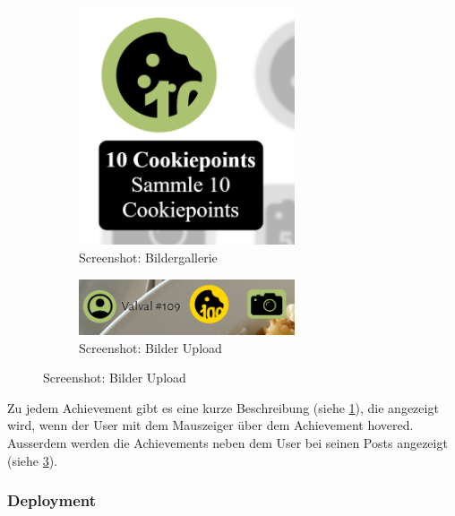 \begin{figure}[htp]
    \begin{subfigure}[b]{0.5\textwidth}
        \centering
        \includegraphics[width=0.7\textwidth]{images/Resultat-Beschreibung.png}
        \caption{Screenshot: Bildergallerie}
        \label{fig:r-Achievement-beschreibung}
    \end{subfigure}
    \begin{subfigure}[b]{0.5\textwidth}
        \centering
        \includegraphics[width=0.7\textwidth]{images/Resultat-Username.png}
        \caption{Screenshot: Bilder Upload}
        \label{fig:r-username-display}
    \end{subfigure}
    \hfill
\end{figure}

Zu jedem Achievement gibt es eine kurze Beschreibung (siehe
\ref{fig:r-Achievement-beschreibung}), die angezeigt wird, wenn der User mit dem
Mauszeiger über dem Achievement hovered. Ausserdem werden die Achievements neben
dem User bei seinen Posts angezeigt (siehe \ref{fig:r-username-display}).

\subsubsection*{Deployment}


